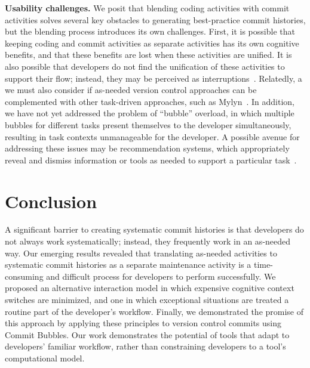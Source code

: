 \documentclass[conference]{IEEEtran}
\begin{document}
\textbf{Usability challenges.} We posit that blending coding activities with commit activities solves several key obstacles to generating best-practice commit histories, but the blending process introduces its own challenges. 
First, it is possible that keeping coding and commit activities as separate activities has its own cognitive benefits, and that these benefits are lost when these activities are unified. 
It is also possible that developers do not find the unification of these activities to support their flow; instead, they may be perceived as interruptions~\cite{Parnin2012}.
% 
Relatedly, a we must also consider if as-needed version control approaches can be complemented with other task-driven approaches, such as Mylyn~\cite{Kersten2006}.
%
In addition, we have not yet addressed the problem of ``bubble'' overload, in which multiple bubbles for different tasks present themselves to the developer simultaneously, resulting in task contexts unmanageable for the developer.
A possible avenue for addressing these issues may be recommendation systems, which appropriately reveal and dismiss information or tools as needed to support a particular task~\cite{Murphy2005}.

\balance

\section{Conclusion}

A significant barrier to creating systematic commit histories is that developers do not always work systematically; instead, they frequently work in an as-needed way. 
Our emerging results revealed that translating as-needed activities to systematic commit histories as a separate maintenance activity is a time-consuming and difficult process for developers to perform successfully. 
We proposed an alternative interaction model in which expensive cognitive context switches are minimized, and one in which exceptional situations
are treated a routine part of the developer's workflow. 
Finally, we demonstrated the promise of this approach by applying these principles to version control commits using Commit Bubbles. 
Our work demonstrates the potential of tools that adapt to developers' familiar workflow, rather than constraining developers to a tool's computational model.
\end{document}
